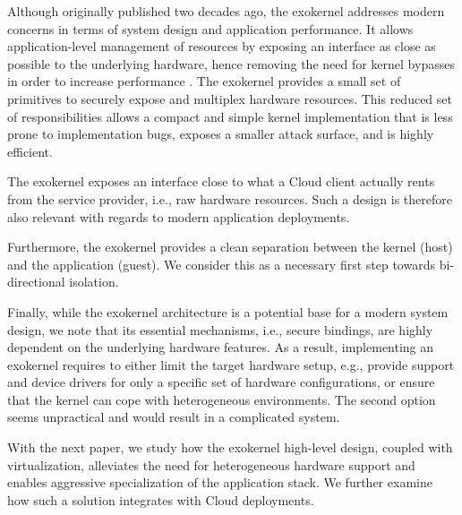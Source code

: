 Although originally published two decades ago, the exokernel addresses modern concerns in terms of system design and application performance.
It allows application-level management of resources by exposing an interface as close as possible to the underlying hardware, hence removing the need for kernel bypasses in order to increase performance \cite{BelayPKGKB14,DBLP:journals/tocs/CaoFKL96}.
The exokernel provides a small set of primitives to securely expose and multiplex hardware resources.
This reduced set of responsibilities allows a compact and simple kernel implementation that is less prone to implementation bugs, exposes a smaller attack surface, and is highly efficient.

The exokernel exposes an interface close to what a Cloud client actually rents from the service provider, i.e., raw hardware resources.
Such a design is therefore also relevant with regards to modern application deployments. 

Furthermore, the exokernel provides a clean separation between the kernel (host) and the application (guest).
We consider this as a necessary first step towards bi-directional isolation.

Finally, while the exokernel architecture is a potential base for a modern system design, we note that its essential mechanisms, i.e., secure bindings, are highly dependent on the underlying hardware features.
As a result, implementing an exokernel requires to either limit the target hardware setup, e.g., provide support and device drivers for only a specific set of hardware configurations, or ensure that the kernel can cope with heterogeneous environments.
The second option seems unpractical and would result in a complicated system.

With the next paper, we study how the exokernel high-level design, coupled with virtualization, alleviates the need for heterogeneous hardware support and enables aggressive specialization of the application stack.
We further examine how such a solution integrates with Cloud deployments.



